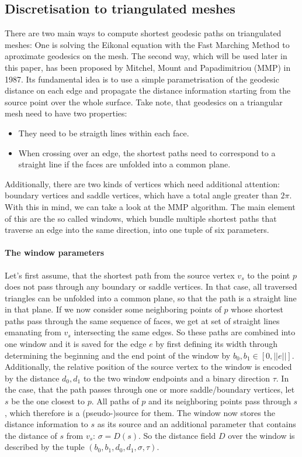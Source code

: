 \subsection*{Discretisation to triangulated meshes}
There are two main ways to compute shortest geodesic paths on triangulated meshes: One is solving the Eikonal equation with the Fast Marching Method to aproximate geodesics on the mesh.
The second way, which will be used later in this paper, has been proposed by Mitchel, Mount and Papadimitriou (MMP) in 1987.
Its fundamental idea is to use a simple parametrisation of the geodesic distance on each edge and propagate the distance information starting from the source point over the whole surface.
Take note, that geodesics on a triangular mesh need to have two properties:
\begin{itemize}
	\item They need to be straigth lines within each face.
	\item When crossing over an edge, the shortest paths need to correspond to a straight line if the faces are unfolded into a common plane.
\end{itemize}
Additionally, there are two kinds of vertices which need additional attention: boundary vertices and saddle vertices, which have a total angle greater than $2\pi$.
With this in mind, we can take a look at the MMP algorithm.
The main element of this are the so called windows, which bundle multiple shortest paths that traverse an edge into the same direction, into one tuple of six parameters.

\paragraph{The window parameters}
Let's first assume, that the shortest path from the source vertex $v_s$ to the point $p$ does not pass through any boundary or saddle vertices.
In that case, all traversed triangles can be unfolded into a common plane, so that the path is a straight line in that plane.
If we now consider some neighboring points of $p$ whose shortest paths pass through the same sequence of faces, we get at set of straight lines emanating from $v_s$ intersecting the same edges.
So these paths are combined into one window and it is saved for the edge $e$ by first defining its width through determining the beginning and the end point of the window by $b_0, b_1 \in [0,||e||]$.
Additionally, the relative position of the source vertex to the window is encoded by the distance $d_0,d_1$ to the two window endpoints and a binary direction $\tau$.
In the case, that the path passes through one or more saddle/boundary vertices, let $s$ be the one closest to $p$.
All paths of $p$ and its neighboring points pass through $s$, which therefore is a (pseudo-)source for them.
The window now stores the distance information to $s$ as its source and an additional parameter that contains the distance of $s$ from $v_s$: $\sigma = D(s)$.
So the distance field $D$ over the window is described by the tuple $(b_0,b_1,d_0,d_1,\sigma,\tau)$.

